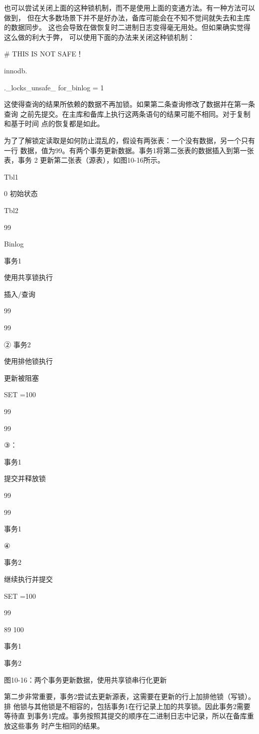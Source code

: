 也可以尝试关闭上面的这种锁机制，而不是使用上面的变通方法。有一种方法可以做到，
但在大多数场景下并不是好办法，备库可能会在不知不觉间就失去和主库的数据同步。
这也会导致在做恢复时二进制日志变得毫无用处。但如果确实觉得这么做的利大于弊，
可以使用下面的办法来关闭这种锁机制：

# THIS IS NOT SAFE！

innodb.

.\_locks\_unsafe\_ for\_binlog = 1

这使得查询的结果所依赖的数据不再加锁。如果第二条查询修改了数据并在第一条查询
之前先提交。在主库和备库上执行这两条语句的结果可能不相同。对于复制和基于时间
点的恢复都是如此。

为了了解锁定读取是如何防止混乱的，假设有两张表：一个没有数据，另一个只有一行
数据，值为99。有两个事务更新数据。事务1将第二张表的数据插入到第一张表，事务
2 更新第二张表（源表），如图10-16所示。

Tbl1

0 初始状态

Tbl2

99

Binlog

事务1

使用共享锁执行

插入/查询

99

99

② 事务2

使用排他锁执行

更新被阻塞

SET =100

99

99

③：

事务1

提交并释放锁

99

99

事务1

④

事务2

继续执行并提交

SET =100

99

89 100

事务1

事务2

图10-16：两个事务更新数据，使用共享锁串行化更新

第二步非常重要，事务2尝试去更新源表，这需要在更新的行上加排他锁（写锁）。排
他锁与其他锁是不相容的，包括事务1在行记录上加的共享锁。因此事务2需要等待直
到事务1完成。事务按照其提交的顺序在二进制日志中记录，所以在备库重放这些事务
时产生相同的结果。


